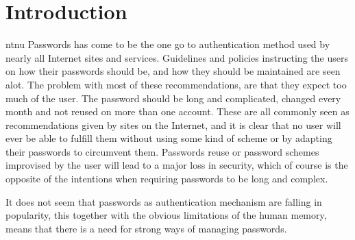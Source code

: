 \chapter{Introduction}
\label{chp:intro} 

\gls{ntnu}
Passwords has come to be the one go to authentication method used by nearly all Internet sites and services. Guidelines and policies instructing the users on how their passwords should be, and how they should be maintained are seen alot. The problem with most of these recommendations, are that they expect too much of the user. The password should be long and complicated, changed every month and not reused on more than one account. These are all commonly seen as recommendations given by sites on the Internet, and it is clear that no user will ever be able to fulfill them without using some kind of scheme or by adapting their passwords to circumvent them. Passwords reuse or password schemes improvised by the user will lead to a major loss in security, which of course is the opposite of the intentions when requiring passwords to be long and complex.  
\par It does not seem that passwords as authentication mechanism are falling in popularity, this together with the obvious limitations of the human memory, means that there is a need for strong ways of managing passwords. 


